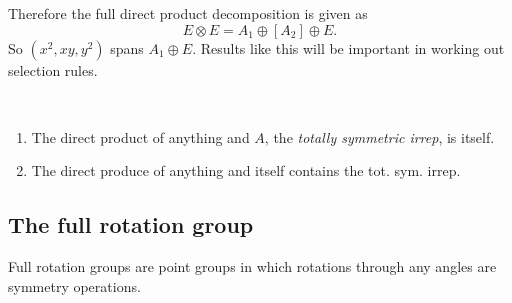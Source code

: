 Therefore the full direct product decomposition is given as
\begin{equation}
E\otimes E=A_1\oplus[A_2]\oplus E.
\end{equation}
So $(x^2,xy,y^2)$ spans $A_1\oplus E$. Results like this will be important in working out selection rules.
\begin{prt}
\ \par
\begin{enumerate}
	\item The direct product of anything and $A$, the \textit{totally symmetric irrep}, is itself.
	\item The direct produce of anything and itself contains the tot. sym. irrep. 
\end{enumerate}
\end{prt}
\subsection{The full rotation group}
Full rotation groups are point groups in which rotations through any angles are symmetry operations.
